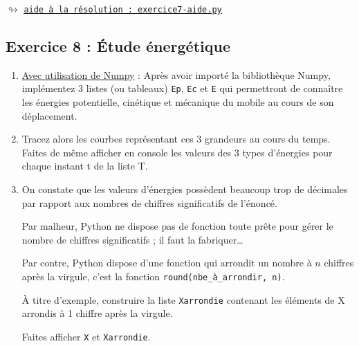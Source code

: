 \documentclass[11pt]{article}
\begin{document}
 
 
 
 
 
 \begin{center}
 $\looparrowright$ \href{https://github.com/formationPythonPC-Juin/aides-formation/blob/master/exercice7-aide.py}{\underline{\texttt{aide à la résolution : exercice7-aide.py}}}
\end{center}
 
 








 
 
 
 
 
 
 
 
 
 
 
 
 
 
 
 
 
 
 
 
 
 \subsection{Exercice 8 : Étude énergétique}
 
 \begin{enumerate}

 
 \item \underline{Avec utilisation de Numpy} : Après avoir importé la bibliothèque Numpy, implémentez 3 listes (ou tableaux) \texttt{Ep}, \texttt{Ec} et \texttt{E} qui permettront de connaître les énergies potentielle, cinétique et mécanique du mobile au cours de son déplacement.

 
 \item Tracez alors les courbes représentant ces 3 grandeurs au cours du temps. Faites de même afficher en console les valeurs des 3 types d'énergies pour chaque instant t de la liste T.
 
 \item On constate que les valeurs d'énergies possèdent beaucoup trop de décimales par rapport aux nombres de chiffres significatifs de l'énoncé.
 
 \smallskip
 Par malheur, Python ne dispose pas de fonction toute prête pour gérer le nombre de chiffres significatifs ; il faut la fabriquer\ldots
 
 \smallskip
 Par contre, Python dispose d'une fonction qui arrondit un nombre à $n$ chiffres après la virgule, c'est la fonction \texttt{round(nbe\_à\_arrondir, n)}.
 
 \smallskip
 À titre d'exemple, construire la liste \texttt{Xarrondie} contenant les éléments de X arrondis à 1 chiffre après la virgule.
 
 \smallskip
 Faites afficher \texttt{X} et \texttt{Xarrondie}.
 
\end{enumerate}
\end{document}

